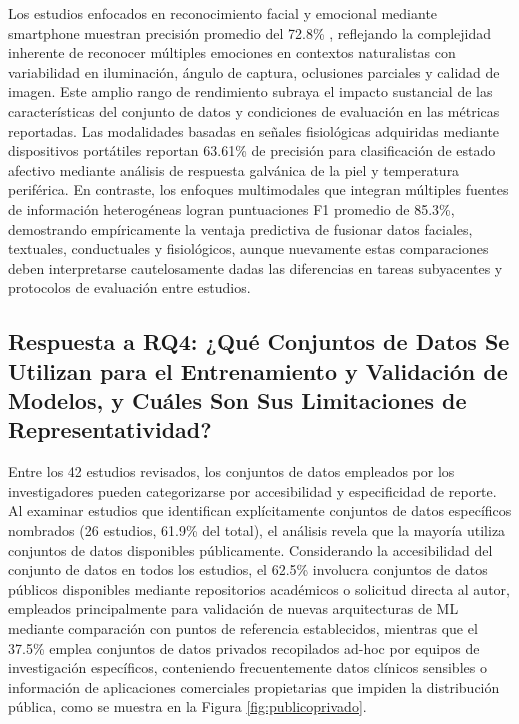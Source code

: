\documentclass{ieeeaccess}
\begin{document}
	Los estudios enfocados en reconocimiento facial y emocional mediante smartphone muestran precisión promedio del 72.8\% \cite{b7}, reflejando la complejidad inherente de reconocer múltiples emociones en contextos naturalistas con variabilidad en iluminación, ángulo de captura, oclusiones parciales y calidad de imagen. Este amplio rango de rendimiento subraya el impacto sustancial de las características del conjunto de datos y condiciones de evaluación en las métricas reportadas. Las modalidades basadas en señales fisiológicas adquiridas mediante dispositivos portátiles \cite{b21} reportan 63.61\% de precisión para clasificación de estado afectivo mediante análisis de respuesta galvánica de la piel y temperatura periférica. En contraste, los enfoques multimodales que integran múltiples fuentes de información heterogéneas \cite{b11,b22} logran puntuaciones F1 promedio de 85.3\%, demostrando empíricamente la ventaja predictiva de fusionar datos faciales, textuales, conductuales y fisiológicos, aunque nuevamente estas comparaciones deben interpretarse cautelosamente dadas las diferencias en tareas subyacentes y protocolos de evaluación entre estudios.
	
	\subsection{Respuesta a RQ4: ¿Qué Conjuntos de Datos Se Utilizan para el Entrenamiento y Validación de Modelos, y Cuáles Son Sus Limitaciones de Representatividad?}
	
	Entre los 42 estudios revisados, los conjuntos de datos empleados por los investigadores pueden categorizarse por accesibilidad y especificidad de reporte. Al examinar estudios que identifican explícitamente conjuntos de datos específicos nombrados (26 estudios, 61.9\% del total), el análisis revela que la mayoría utiliza conjuntos de datos disponibles públicamente. Considerando la accesibilidad del conjunto de datos en todos los estudios, el 62.5\% involucra conjuntos de datos públicos disponibles mediante repositorios académicos o solicitud directa al autor, empleados principalmente para validación de nuevas arquitecturas de ML mediante comparación con puntos de referencia establecidos, mientras que el 37.5\% emplea conjuntos de datos privados recopilados ad-hoc por equipos de investigación específicos, conteniendo frecuentemente datos clínicos sensibles o información de aplicaciones comerciales propietarias que impiden la distribución pública, como se muestra en la Figura \ref{fig:publicoprivado}.
	
\end{document}
